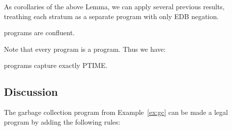 As corollaries of the above Lemma, we can apply several previous results, treathing each stratum as a separate program with only EDB negation.

\begin{corollary}
\label{cor:plang-confluent}
\plang programs are confluent.
\end{corollary}

Note that every \slang program is a \plang program.  Thus we have:

\begin{corollary}
\label{cor:plang-ptime}
\plang programs capture exactly PTIME.
\end{corollary}




\subsection{Discussion}
The garbage collection program from Example~\ref{ex:gc} can be made a legal 
\plang program by adding the following rules:

